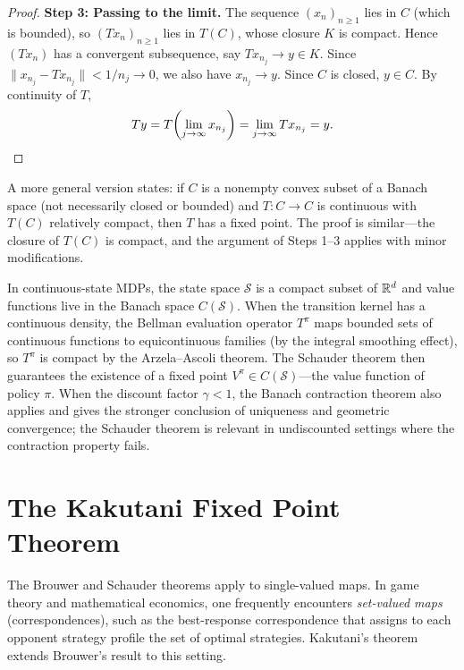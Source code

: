 \documentclass[11pt,a4paper]{article}
\begin{document}
\begin{proof}
\textbf{Step 3: Passing to the limit.}
The sequence $(x_n)_{n \geq 1}$ lies in $C$ (which is bounded), so
$(Tx_n)_{n \geq 1}$ lies in $T(C)$, whose closure $K$ is compact.
Hence $(Tx_n)$ has a convergent subsequence, say
$Tx_{n_j} \to y \in K$.  Since
$\|x_{n_j} - Tx_{n_j}\| < 1/n_j \to 0$, we also have
$x_{n_j} \to y$.  Since $C$ is closed, $y \in C$.  By continuity
of $T$,
\[
    Ty = T\!\left(\lim_{j \to \infty} x_{n_j}\right)
    = \lim_{j \to \infty} Tx_{n_j} = y.
    \qedhere
\]
\end{proof}

\begin{remark}
\label{rem:schauder-variants}
A more general version states: if $C$ is a nonempty convex subset of
a Banach space (not necessarily closed or bounded) and
$T \colon C \to C$ is continuous with $T(C)$ relatively compact, then
$T$ has a fixed point.  The proof is similar---the closure of $T(C)$
is compact, and the argument of Steps 1--3 applies with minor
modifications.
\end{remark}

\begin{rlconnection}[title={Schauder and Continuous MDPs}]
In continuous-state MDPs, the state space $\mathcal{S}$ is a compact
subset of $\mathbb{R}^d$ and value functions live in the Banach space
$C(\mathcal{S})$.  When the transition kernel has a continuous
density, the Bellman evaluation operator $T^\pi$ maps bounded sets of
continuous functions to equicontinuous families (by the integral
smoothing effect), so $T^\pi$ is compact by the Arzela--Ascoli
theorem.  The Schauder theorem then guarantees the existence of a
fixed point $V^\pi \in C(\mathcal{S})$---the value function of
policy $\pi$.  When the discount factor $\gamma < 1$, the Banach
contraction theorem also applies and gives the stronger conclusion of
uniqueness and geometric convergence; the Schauder theorem is
relevant in undiscounted settings where the contraction property
fails.
\end{rlconnection}


\section{The Kakutani Fixed Point Theorem}
\label{sec:kakutani}

The Brouwer and Schauder theorems apply to single-valued maps.  In
game theory and mathematical economics, one frequently encounters
\emph{set-valued maps} (correspondences), such as the best-response
correspondence that assigns to each opponent strategy profile the set
of optimal strategies.  Kakutani's theorem extends Brouwer's result to
this setting.
\end{document}
